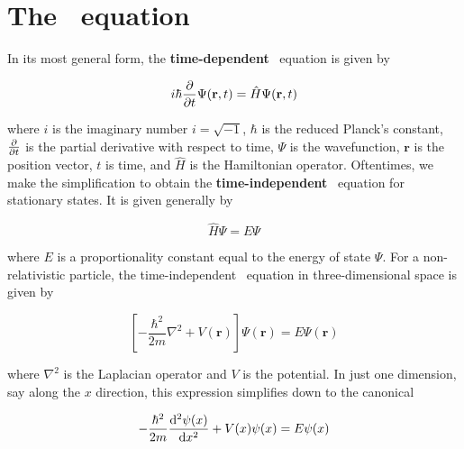 \section{The \Sch\ equation}

In its most general form, the \textbf{time-dependent} \Sch\ equation is given by 

\begin{tcolorbox}[title=Time-dependent \Sch\ equation] \vspace{-2ex}
\begin{equation*}
	i\hbar \pdv{t} \Psi(\textbf{r}, t) = \hat{H}\Psi(\textbf{r}, t)
\end{equation*}
\end{tcolorbox}

\noindent where $i$ is the imaginary number $i=\sqrt{-1}$, $\hbar$ is the reduced Planck's constant, $\pdv{t}$ is the partial derivative with respect to time, $\Psi$ is the wavefunction, $\mathbf{r}$ is the position vector, $t$ is time, and $\hat{H}$ is the Hamiltonian operator. 
Oftentimes, we make the simplification to obtain the \textbf{time-independent} \Sch\ equation for stationary states. 
It is given generally by

\begin{equation*}
	\hat{H}\Psi = E\Psi
\end{equation*}

\noindent where $E$ is a proportionality constant equal to the energy of state $\Psi$. 
For a non-relativistic particle, the time-independent \Sch\ equation in three-dimensional space is given by 

\begin{equation*}
	\left[ -\dfrac{\hbar^2}{2m} \nabla^2 + V(\mathbf{r}) \right]\Psi(\mathbf{r}) = E\Psi(\mathbf{r})
\end{equation*}

\noindent where $\nabla^2$ is the Laplacian operator and $V$ is the potential. 
In just one dimension, say along the $x$ direction, this expression simplifies down to the canonical

\begin{tcolorbox}[title=Time-independent \Sch\ equation] \vspace{-2ex}
	\[ -\dfrac{\hbar^2}{2m} \dv[2]{\psi(x)}{x} + V(x)\psi(x) = E\psi(x) \]
\end{tcolorbox}

%